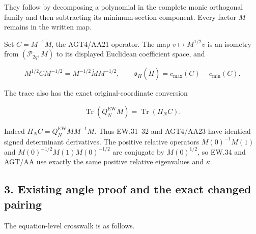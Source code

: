 They follow by decomposing a polynomial in the complete monic orthogonal family and then subtracting its minimum-section component. Every factor \(M\) remains in the written map.

Set \(C=M^{-1}\dot M\), the AGT4/AA21 operator. The map \(v\mapsto M^{1/2}v\) is an isometry from \((\mathcal P_{2q},M)\) to its displayed Euclidean coefficient space, and

\[
M^{1/2}CM^{-1/2}=M^{-1/2}\dot M M^{-1/2},\qquad
\mathfrak o_H(\dot H)=c_{\max}(C)-c_{\min}(C).
\tag{EP8}
\]

The trace also has the exact original-coordinate conversion

\[
\operatorname{Tr}(Q_N^{\mathrm{EW}}\dot M)
=\operatorname{Tr}(\Pi_N C).
\tag{EP9}
\]

Indeed \(\Pi_N C=Q_N^{\mathrm{EW}}MM^{-1}\dot M\). Thus EW.31--32 and AGT4/AA23 have identical signed determinant derivatives. The positive relative operators \(M(0)^{-1}M(1)\) and \(M(0)^{-1/2}M(1)M(0)^{-1/2}\) are conjugate by \(M(0)^{1/2}\), so EW.34 and AGT/AA use exactly the same positive relative eigenvalues and \(\kappa\).

\subsection{3. Existing angle proof and the exact changed pairing}\label{existing-angle-proof-and-the-exact-changed-pairing}

The equation-level crosswalk is as follows.

